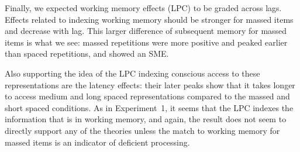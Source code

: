 
Finally, we expected working memory effects (LPC) to be graded across lags.
Effects related to indexing working memory should be stronger for massed items and decrease with lag.  This larger difference of subsequent memory for massed items is what we see: massed repetitions were more positive and peaked earlier than spaced repetitions, and showed an SME.

Also supporting the idea of the LPC indexing conscious access to these representations are the latency effects: their later peaks show that it takes longer to access medium and long spaced representations compared to the massed and short spaced conditions.
As in Experiment~1, it seems that the LPC indexes the information that is in working memory, and again, the result does not seem to directly support any of the theories unless the match to working memory for massed items is an indicator of deficient processing.



